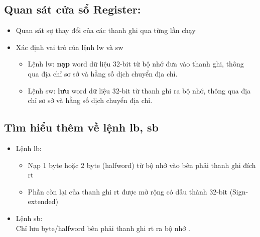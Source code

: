 \documentclass[12pt,a4paper,oneside]{article}
\begin{document}
	\subsection{Quan sát cửa sổ Register:}
	\begin{itemize}
	\item Quan sát sự thay đổi của các thanh ghi qua từng lần chạy
	\item Xác định vai trò của lệnh lw và sw
	\begin{itemize}
	\item Lệnh lw: \textbf{nạp} word dữ liệu 32-bit từ bộ nhớ đưa vào thanh ghi, thông qua địa chỉ sơ sở và hằng số dịch chuyển địa chỉ.
	\item Lệnh sw: \textbf{lưu} word dữ liệu 32-bit từ thanh ghi ra bộ nhớ, thông qua địa chỉ sơ sở và hằng số dịch chuyển địa chỉ.
	\end{itemize}
	\end{itemize}
	\subsection{Tìm hiểu thêm về lệnh lb, sb}
	\begin{itemize}
	\item Lệnh lb:
	\begin{itemize}
	\item Nạp 1 byte hoặc 2 byte (halfword) từ bộ nhớ vào bên phải thanh ghi đích rt 
	\item Phần còn lại của thanh ghi rt được mở rộng có dấu thành 32-bit (Sign-extended)
	\end{itemize}
	\item Lệnh sb:\\Chỉ lưu byte/halfword bên phải thanh ghi rt ra bộ nhớ .
	\end{itemize}
\end{document}

